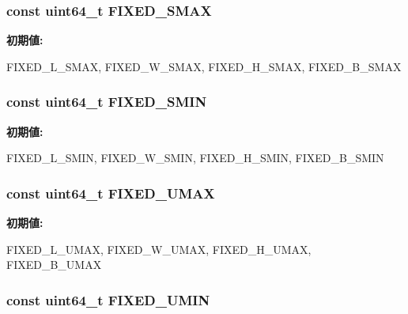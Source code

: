 \label{namespaceMipsISA_a3f3ee51cb5f4d1e09a5b0657804afaec}
\hypertarget{namespaceMipsISA_ab0e1ac60266a62ef6254becec7c6735f}{
\subsubsection[{FIXED\_\-SMAX}]{\setlength{\rightskip}{0pt plus 5cm}const uint64\_\-t {\bf FIXED\_\-SMAX}}}
\label{namespaceMipsISA_ab0e1ac60266a62ef6254becec7c6735f}
{\bfseries 初期値:}
\begin{DoxyCode}

{ FIXED_L_SMAX, FIXED_W_SMAX, FIXED_H_SMAX, FIXED_B_SMAX }
\end{DoxyCode}
\hypertarget{namespaceMipsISA_aaf5085bdcb1ce2a10d64f7b17b6f46fe}{
\subsubsection[{FIXED\_\-SMIN}]{\setlength{\rightskip}{0pt plus 5cm}const uint64\_\-t {\bf FIXED\_\-SMIN}}}
\label{namespaceMipsISA_aaf5085bdcb1ce2a10d64f7b17b6f46fe}
{\bfseries 初期値:}
\begin{DoxyCode}

{ FIXED_L_SMIN, FIXED_W_SMIN, FIXED_H_SMIN, FIXED_B_SMIN }
\end{DoxyCode}
\hypertarget{namespaceMipsISA_af1e0a1b1164ae2aed24ee07342194d8c}{
\subsubsection[{FIXED\_\-UMAX}]{\setlength{\rightskip}{0pt plus 5cm}const uint64\_\-t {\bf FIXED\_\-UMAX}}}
\label{namespaceMipsISA_af1e0a1b1164ae2aed24ee07342194d8c}
{\bfseries 初期値:}
\begin{DoxyCode}

{ FIXED_L_UMAX, FIXED_W_UMAX, FIXED_H_UMAX, FIXED_B_UMAX }
\end{DoxyCode}
\hypertarget{namespaceMipsISA_aeab1d8da14eb0f232765217502c593da}{
\subsubsection[{FIXED\_\-UMIN}]{\setlength{\rightskip}{0pt plus 5cm}const uint64\_\-t {\bf FIXED\_\-UMIN}}}
